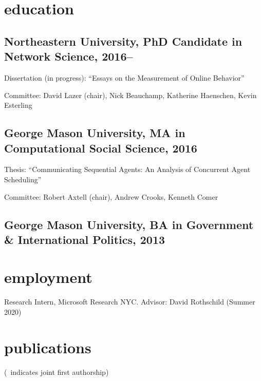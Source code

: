 \documentclass[11pt, letter]{article}
\title{}
\begin{document}
\maketitle

\section{education}
\subsection{Northeastern University, PhD Candidate in Network Science, 2016--}
Dissertation (in progress): ``Essays on the Measurement of Online Behavior''

Committee: David Lazer (chair), Nick Beauchamp, Katherine Haenschen, Kevin Esterling

\subsection{George Mason University, MA in Computational Social Science, 2016}
Thesis: ``Communicating Sequential Agents: An Analysis of Concurrent Agent
Scheduling''

Committee: Robert Axtell (chair), Andrew Crooks, Kenneth Comer
\subsection{George Mason University, BA in Government \& International Politics,
  2013}

\vspace{2mm}

\section{employment}
Research Intern, Microsoft Research NYC. Advisor: David Rothschild (Summer 2020)
\vspace{-1mm}
\section{publications}
\vspace{1mm} {\footnotesize (\textdagger\, indicates joint first authorship)}
\subsection*{} %
\end{document}

